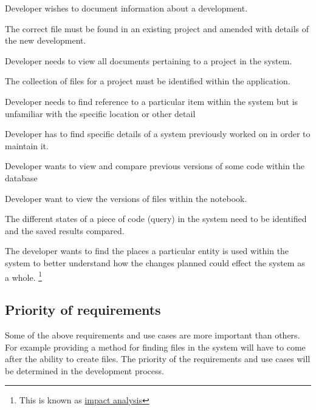\begin{usecase}
Developer wishes to document information about a development.

The correct file must be found in an existing project and amended with details
of the new development.
\end{usecase}
\begin{usecase}
Developer needs to view all documents pertaining to a project in the
system.

The collection of files for a project must be identified within the
application.
\end{usecase}
\begin{usecase}
Developer needs to find reference to a particular item within the system
but is unfamiliar with the specific location or other detail

\end{usecase}
\begin{usecase}
Developer has to find specific details of a system previously worked on
in order to maintain it.

\end{usecase}
\begin{usecase}
Developer wants to view and compare previous versions of some code
within the database

\end{usecase}
\begin{usecase}
Developer want to view the versions of files within the notebook.

The different states of a piece of code (query) in the system need to be identified and the saved results compared.

\end{usecase}
\begin{usecase}
The developer wants to find the places a particular entity is used
within the system to better understand how the changes planned could
effect the system as a whole. \footnote{%
  This is known as %
  \href{https://en.wikipedia.org/wiki/Change\_impact\_analysis}{impact
analysis}%
}

\end{usecase}

\subsection{Priority of requirements}

Some of the above requirements and use cases are more important than others. For example providing a method for finding files in the system will have to come after the ability to create files.
The priority of the requirements and use cases will be determined in the development process.
